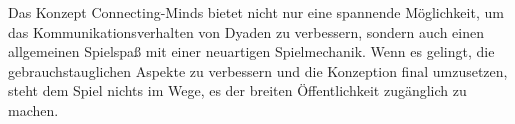 Das Konzept Connecting-Minds bietet nicht nur eine spannende Möglichkeit, um das Kommunikationsverhalten von Dyaden zu verbessern, sondern auch einen allgemeinen Spielspaß mit einer neuartigen Spielmechanik. Wenn es gelingt, die gebrauchstauglichen Aspekte zu verbessern und die Konzeption final umzusetzen, steht dem Spiel nichts im Wege, es der breiten Öffentlichkeit zugänglich zu machen.